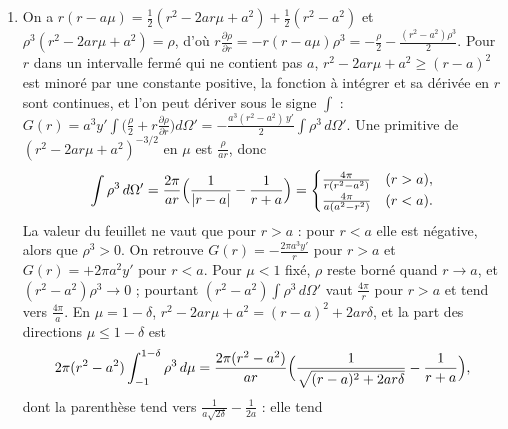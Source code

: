 \documentclass[11pt,a4paper]{article}
\begin{document}
\begin{solution}
\begin{enumerate}
  Les valeurs lues sur la vue 27 n'ont pas de signe moins (comme $\frac{du}{dr}$ à
  la vue 23), le radical n'y couvre que le $2$, et la dérivée y porte $a$ où il faut
  $a^2$ ; avec elles la somme ne s'annulerait pas. Comme
  $\int_{-1}^{1}\frac{d\mu}{\sqrt{1-\mu}} = 2\sqrt2$, les intégrales convergent et
  \[
  u_d = \frac{2\pi a^2y'}{\sqrt2}\cdot2\sqrt2 = 4\pi a^2y', \qquad
  u'_d = -\frac{2\pi ay'}{2\sqrt2}\cdot2\sqrt2 = -2\pi ay', \qquad
  G_d = 2\pi a^2y' - 2\pi a^2y' = 0 .
  \]
  $u_d$ est bien $u(a)$. Mais $u'_d = \frac12(-4\pi ay' + 0)$ et
  $G_d = \frac12(-2\pi a^2y' + 2\pi a^2y')$ : la valeur directe est la moyenne des
  deux limites latérales. Le calcul des vues 23 et 27, signes rétablis, ne se trompe
  pas sur cette intégrale ; il se trompe en la prenant pour la dérivée de $u$ en
  $r = a$, où $u$ n'est pas dérivable.
\item On a $r(r - a\mu) = \frac12(r^2 - 2ar\mu + a^2) + \frac12(r^2 - a^2)$ et
  $\rho^3(r^2 - 2ar\mu + a^2) = \rho$, d'où
  $r\frac{\partial\rho}{\partial r} = -r(r-a\mu)\rho^3
  = -\frac\rho2 - \frac{(r^2-a^2)\rho^3}{2}$. Pour $r$ dans un intervalle fermé qui
  ne contient pas $a$, $r^2 - 2ar\mu + a^2 \ge (r-a)^2$ est minoré par une constante
  positive, la fonction à intégrer et sa dérivée en $r$ sont continues, et l'on peut
  dériver sous le signe $\int$ : $G(r) = a^3y'\int\bigl(\frac\rho2 +
  r\frac{\partial\rho}{\partial r}\bigr)d\Omega' = -\frac{a^3(r^2-a^2)\,y'}{2}
  \int\rho^3\,d\Omega'$. Une primitive de $(r^2 - 2ar\mu + a^2)^{-3/2}$ en $\mu$ est
  $\frac{\rho}{ar}$, donc
  \[
  \int\rho^3\,d\Omega' = \frac{2\pi}{ar}\Bigl(\frac{1}{|r-a|} - \frac{1}{r+a}\Bigr)
  = \begin{cases}
  \frac{4\pi}{r(r^2-a^2)} & (r > a),\\
  \frac{4\pi}{a(a^2-r^2)} & (r < a).
  \end{cases}
  \]
  La valeur du feuillet ne vaut que pour $r > a$ : pour $r < a$ elle est négative,
  alors que $\rho^3 > 0$. On retrouve $G(r) = -\frac{2\pi a^3y'}{r}$ pour $r > a$ et
  $G(r) = +2\pi a^2y'$ pour $r < a$. Pour $\mu < 1$ fixé, $\rho$ reste borné quand
  $r \to a$, et $(r^2-a^2)\rho^3 \to 0$ ; pourtant $(r^2-a^2)\int\rho^3\,d\Omega'$ vaut
  $\frac{4\pi}{r}$ pour $r > a$ et tend vers $\frac{4\pi}{a}$. En
  $\mu = 1 - \delta$, $r^2 - 2ar\mu + a^2 = (r-a)^2 + 2ar\delta$, et la part des
  directions $\mu \le 1 - \delta$ est
  \[
  2\pi(r^2-a^2)\int_{-1}^{1-\delta}\rho^3\,d\mu
  = \frac{2\pi(r^2-a^2)}{ar}\Bigl(\frac{1}{\sqrt{(r-a)^2 + 2ar\delta}} - \frac{1}{r+a}\Bigr),
  \]
  dont la parenthèse tend vers $\frac{1}{a\sqrt{2\delta}} - \frac{1}{2a}$ : elle tend

\end{enumerate}
\end{solution}
\end{document}

